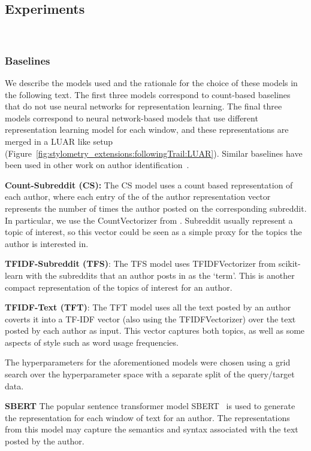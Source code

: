 \subsection{Experiments}\

\subsubsection{Baselines}

We describe the models used and the rationale for the choice of these models in the following text.
The first three models correspond to count-based baselines that do not use neural networks for representation learning.
The final three models correspond to neural network-based models that use different representation learning model for each window, and these representations are merged in a LUAR like setup (Figure~\ref{fig:stylometry_extensions:followingTrail:LUAR}).
Similar baselines have been used in other work on author identification~\cite{wang2023can,soto2024fewshot}.

\noindent \textbf{Count-Subreddit (CS):}
The CS model uses a count based representation of each author, where each entry of the of the author representation vector represents the number of times the author posted on the corresponding subreddit.
In particular, we use the CountVectorizer from \citet{scikit-learn}. %
Subreddit usually represent a topic of interest, so this vector could be seen as a simple proxy for the topics the author is interested in.

\noindent \textbf{TFIDF-Subreddit (TFS)}:
The TFS model uses TFIDFVectorizer from scikit-learn with the subreddits that an author posts in as the `term'.
This is another compact representation of the topics of interest for an author.

\noindent \textbf{TFIDF-Text (TFT)}:
The TFT model uses all the text posted by an author coverts it into a TF-IDF vector (also using the TFIDFVectorizer) over the text posted by each author as input.
This vector captures both topics, as well as some aspects of style such as word usage frequencies.

The hyperparameters for the aforementioned models were chosen using a grid search over the hyperparameter space with a separate split of the query/target data.

\noindent \textbf{SBERT} The popular sentence transformer model SBERT~\cite{reimers2019sentencebert} is used to generate the representation for each window of text for an author.
The representations from this model may capture the semantics and syntax associated with the text posted by the author.


